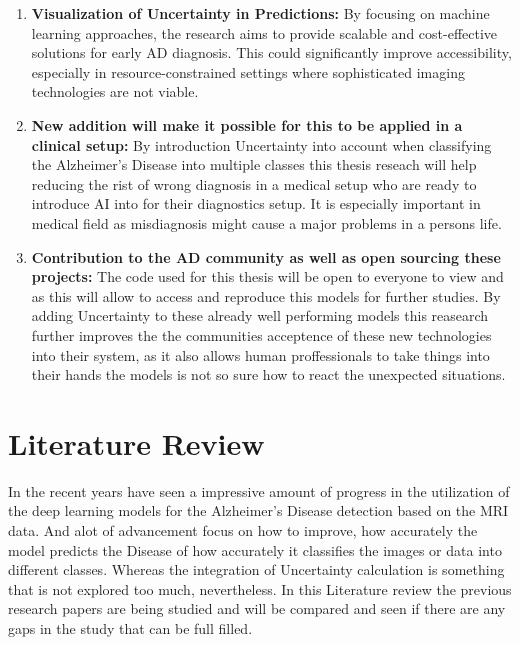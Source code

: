 \documentclass[12pt,onecolumn]{report}
\begin{document}
\begin{enumerate}
    \item \textbf{Visualization of Uncertainty in Predictions:} By focusing on machine learning approaches, the research aims to provide scalable and cost-effective solutions for early AD diagnosis. This could significantly improve accessibility, especially in resource-constrained settings where sophisticated imaging technologies are not viable.

    \item \textbf{New addition will make it possible for this to be applied in a clinical setup:} By introduction Uncertainty into account when classifying the Alzheimer’s Disease into multiple classes this thesis reseach will help reducing the rist of wrong diagnosis in a medical setup who are ready to introduce AI into for their diagnostics setup. It is especially important in medical field as misdiagnosis might cause a major problems in a persons life.

    \item \textbf{Contribution to the AD community as well as open sourcing these projects:} The code used for this thesis will be open to everyone to view and as this will allow to access and reproduce this models for further studies. By adding Uncertainty to these already well performing models this reasearch further improves the the communities acceptence of these new technologies into their system, as it also allows human proffessionals to take things into their hands the models is not so sure how to react the unexpected situations.

\end{enumerate}



\chapter{Literature Review}

In the recent years have seen a impressive amount of progress in the utilization of the deep learning models for the Alzheimer’s Disease detection based on the MRI data. And alot of advancement focus on how to improve, how accurately the model predicts the Disease of how accurately it classifies the images or data into different classes. Whereas the integration of Uncertainty calculation is something that is not explored too much, nevertheless. In this Literature review the previous research papers are being studied and will be compared and seen if there are any gaps in the study that can be full filled.
\end{document}
